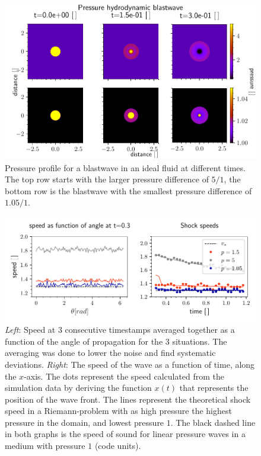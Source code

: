 \begin{figure}[H]
	\centering
	\includegraphics[width=\linewidth]{images/HD-blast-prs-1.pdf}
	\caption{Pressure profile for a blastwave in an ideal fluid at different times. The top row starts with the larger pressure difference of $5/1$, the bottom row is the blastwave with the smallest pressure difference of $1.05/1$.}
	\label{fig:HD-blast-short}
\end{figure}

\begin{figure}[H]
	\centering
	\includegraphics[width=\linewidth]{images/HD-speed.pdf}
	\caption{\emph{Left}: Speed at 3 consecutive timestamps averaged together as a function of the angle of propagation for the 3 situations. 
		The averaging was done to lower the noise and find systematic deviations.
	\emph{Right}: The speed of the wave as a function of time, along the $x$-axis. 
	The dots represent the speed calculated from the simulation data by deriving the function $x(t)$ that represents the position of the wave front. 
	The lines represent the theoretical shock speed in a Riemann-problem with as high pressure the highest pressure in the domain, and lowest pressure $1$.
	The black dashed line in both graphs is the speed of sound for linear pressure waves in a medium with pressure $1$ (code units).}
	\label{fig:HD-speed}
\end{figure}

